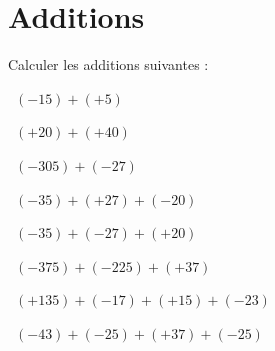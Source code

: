 
	\section{Additions}
	
	Calculer les additions suivantes :
	\begin{questions}
	
		\question[1]  $(-15) + (+ 5)$
		\fillwithdottedlines{1cm}
		\begin{solution}
			
		\end{solution}
	
		\question[1]  $(+20) + (+ 40)$
		\fillwithdottedlines{1cm}
		\begin{solution}
			
		\end{solution}
	
	
		
	
		\question[1]  $(-305) + (-27)$
		\fillwithdottedlines{1cm}
		\begin{solution}
			
		\end{solution}
	
	
		\question[1]  $(-35) + (+27)  + (-20)$
		\fillwithdottedlines{1.5cm}
		\begin{solution}
			
		\end{solution}
	
	
		\question[2]  $(-35) + (-27)  + (+20)$
		\fillwithdottedlines{1.5cm}
		\begin{solution}
			
		\end{solution}
	
	
	
	
		\question[2]  $(-375) + (-225) + (+37)$
		\fillwithdottedlines{1.5cm}
		\begin{solution}
			
		\end{solution}
	
	
		\question[2]  $(+135) + (-17) + (+15) + (-23)$ 
		\fillwithdottedlines{2cm}
		\begin{solution}
			
		\end{solution}
	
	
		\question[2]  $(-43) + (-25) + (+37) + (-25)$ 
		\fillwithdottedlines{2cm}
		\begin{solution}
			
		\end{solution}
	\end{questions}
	
